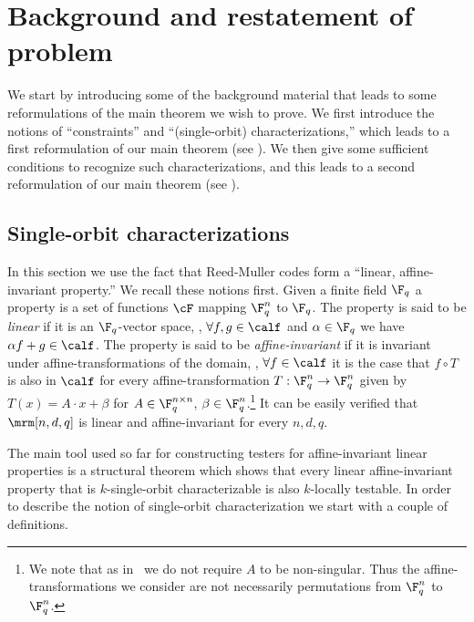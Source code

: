 \section{Background and restatement of problem}
\label{sec:restate}

We start by introducing some of the background
material that leads to some reformulations of the
main theorem we wish to prove. We first introduce
the notions of ``constraints'' and ``(single-orbit)
characterizations,'' which leads to a first reformulation
of our main theorem (see ).
We then give some sufficient
conditions to recognize such characterizations,
and this leads to a second reformulation of our
main theorem (see ).


\subsection{Single-orbit characterizations}

In this section we use the fact that Reed-Muller codes
form a ``linear, affine-invariant property.'' We recall
these notions first.
Given a finite field $\F_q$ a
property is a set of functions $\cF$ mapping $\F_{q}^n$ to $\F_q$.
The property is said to
be
\emph{linear} if
it is an $\F_q$-vector space, \ie, $\forall f,g \in \calf$
and $\alpha \in \F_q$ we have $\alpha f + g \in \calf$.
The property is said to be \emph{affine-invariant} if it is invariant under
affine-transformations of the domain, \ie,
$\forall f \in \calf$ it is the case that $f \circ T$ is also
in $\calf$ for every affine-transformation $T: \F_q^n \to \F_q^n$ given by $T(x) = A \cdot x + \beta$ for $A \in \F_q^{n \times n}$, $\beta \in \F_q^n$.\footnote{We note that as in~\cite{KS08} we do not require $A$ to be
non-singular. Thus the affine-transformations we consider are not
necessarily permutations from $\F_q^n$ to $\F_q^n$.}
It can be easily verified that $\mrm[n,d,q]$ is linear and affine-invariant
for every $n, d, q$.

The main tool used so far for constructing testers for affine-invariant linear properties is a
 structural theorem which shows that every linear affine-invariant property that is $k$-single-orbit characterizable
 is also $k$-locally testable.
 In order to describe the notion of single-orbit characterization we start with a couple of definitions.


